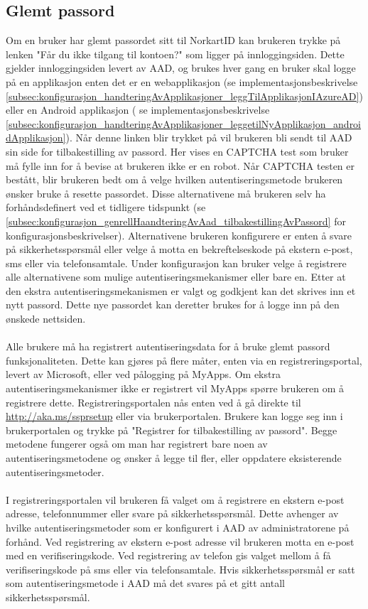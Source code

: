\subsection{Glemt passord}
\label{subsec:konfigurasjon_innloggingsmekanismer_glemtPassord}
Om en bruker har glemt passordet sitt til NorkartID kan brukeren trykke på lenken "Får du ikke tilgang til kontoen?" som ligger på innloggingsiden. Dette gjelder innloggingsiden levert av AAD, og brukes hver gang en bruker skal logge på en applikasjon enten det er en webapplikasjon (se implementasjonsbeskrivelse \ref{subsec:konfigurasjon_handteringAvApplikasjoner_leggTilApplikasjonIAzureAD}) eller en Android applikasjon ( se implementasjonsbeskrivelse \ref{subsec:konfigurasjon_handteringAvApplikasjoner_leggetilNyApplikasjon_androidApplikasjon}). Når denne linken blir trykket på vil brukeren bli sendt til AAD sin side for tilbakestilling av passord. Her vises en CAPTCHA test som bruker må fylle inn for å bevise at brukeren ikke er en robot. Når CAPTCHA testen er bestått, blir brukeren bedt om å velge hvilken autentiseringsmetode brukeren ønsker bruke å resette passordet. Disse alternativene må brukeren selv ha forhåndsdefinert ved et tidligere tidspunkt (se \ref{subsec:konfigurasjon_genrellHaandteringAvAad_tilbakestillingAvPassord} for konfigurasjonsbeskrivelser). Alternativene brukeren konfigurere er enten å svare på sikkerhetsspørsmål eller velge å motta en bekreftelseskode på ekstern e-post, sms eller via telefonsamtale. Under konfigurasjon kan bruker velge å registrere alle alternativene som mulige autentiseringsmekanismer eller bare en. Etter at den ekstra autentiseringsmekanismen er valgt og godkjent kan det skrives inn et nytt passord. Dette nye passordet kan deretter brukes for å logge inn på den ønskede nettsiden.\\
\\
Alle brukere må ha registrert autentiseringsdata for å bruke glemt passord funksjonaliteten. Dette kan gjøres på flere måter, enten via en registreringsportal, levert av Microsoft, eller ved pålogging på MyApps. Om ekstra autentiseringsmekanismer ikke er registrert vil MyApps spørre brukeren om å registrere dette. Registreringsportalen nås enten ved å gå direkte til \url{http://aka.ms/ssprsetup} eller via brukerportalen. Brukere kan logge seg inn i brukerportalen og trykke på "Registrer for tilbakestilling av passord". Begge metodene fungerer også om man har registrert bare noen av autentiseringsmetodene og ønsker å legge til fler, eller oppdatere eksisterende autentiseringsmetoder.
\\
\\
I registreringsportalen vil brukeren få valget om å registrere en ekstern e-post adresse, telefonnummer eller svare på sikkerhetsspørsmål. Dette avhenger av hvilke autentiseringsmetoder som er konfigurert i AAD av administratorene på forhånd. Ved registrering av ekstern e-post adresse vil brukeren motta en e-post med en verifiseringskode. Ved registrering av telefon gis valget mellom å få verifiseringskode på sms eller via telefonsamtale. Hvis sikkerhetsspørsmål er satt som autentiseringsmetode i AAD må det svares på et gitt antall sikkerhetsspørsmål.

